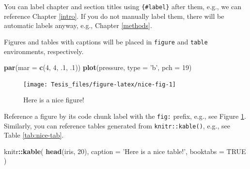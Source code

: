 \documentclass[10pt,twoside,letterpaper]{phstylee}
\newenvironment{Shaded}{\begin{snugshade}}{\end{snugshade}}
\newcommand{\DataTypeTok}[1]{\textcolor[rgb]{0.13,0.29,0.53}{#1}}
\newcommand{\DecValTok}[1]{\textcolor[rgb]{0.00,0.00,0.81}{#1}}
\newcommand{\FloatTok}[1]{\textcolor[rgb]{0.00,0.00,0.81}{#1}}
\newcommand{\KeywordTok}[1]{\textcolor[rgb]{0.13,0.29,0.53}{\textbf{#1}}}
\newcommand{\NormalTok}[1]{#1}
\newcommand{\OperatorTok}[1]{\textcolor[rgb]{0.81,0.36,0.00}{\textbf{#1}}}
\newcommand{\OtherTok}[1]{\textcolor[rgb]{0.56,0.35,0.01}{#1}}
\newcommand{\StringTok}[1]{\textcolor[rgb]{0.31,0.60,0.02}{#1}}
\begin{document}
You can label chapter and section titles using \texttt{\{\#label\}} after them, e.g., we can reference Chapter \ref{intro}. If you do not manually label them, there will be automatic labels anyway, e.g., Chapter \ref{methods}.

Figures and tables with captions will be placed in \texttt{figure} and \texttt{table} environments, respectively.

\begin{Shaded}
\begin{Highlighting}[]
\KeywordTok{par}\NormalTok{(}\DataTypeTok{mar =} \KeywordTok{c}\NormalTok{(}\DecValTok{4}\NormalTok{, }\DecValTok{4}\NormalTok{, }\FloatTok{.1}\NormalTok{, }\FloatTok{.1}\NormalTok{))}
\KeywordTok{plot}\NormalTok{(pressure, }\DataTypeTok{type =} \StringTok{'b'}\NormalTok{, }\DataTypeTok{pch =} \DecValTok{19}\NormalTok{)}
\end{Highlighting}
\end{Shaded}

\begin{figure}

{\centering \texttt{[image: Tesis\_files/figure-latex/nice-fig-1]} 

}

\caption{Here is a nice figure!}\label{fig:nice-fig}
\end{figure}

Reference a figure by its code chunk label with the \texttt{fig:} prefix, e.g., see Figure \ref{fig:nice-fig}. Similarly, you can reference tables generated from \texttt{knitr::kable()}, e.g., see Table \ref{tab:nice-tab}.

\begin{Shaded}
\begin{Highlighting}[]
\NormalTok{knitr}\OperatorTok{::}\KeywordTok{kable}\NormalTok{(}
  \KeywordTok{head}\NormalTok{(iris, }\DecValTok{20}\NormalTok{), }\DataTypeTok{caption =} \StringTok{'Here is a nice table!'}\NormalTok{,}
  \DataTypeTok{booktabs =} \OtherTok{TRUE}
\NormalTok{)}
\end{Highlighting}
\end{Shaded}
\end{document}

